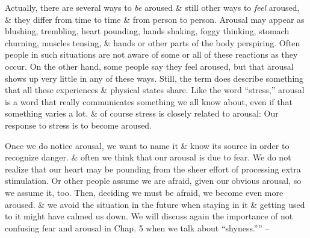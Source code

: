 \documentclass{article}
\numberwithin{equation}{section}
\begin{document}
Actually, there are several ways to \textit{be} aroused \& still other ways to \textit{feel} aroused, \& they differ from time to time \& from person to person. Arousal may appear as blushing, trembling, heart pounding, hands shaking, foggy thinking, stomach churning, muscles tensing, \& hands or other parts of the body perspiring. Often people in such situations are not aware of some or all of these reactions as they occur. On the other hand, some people say they feel aroused, but that arousal shows up very little in any of these ways. Still, the term does describe something that all these experiences \& physical states share. Like the word ``stress,'' arousal is a word that really communicates something we all know about, even if that something varies a lot. \& of course stress is closely related to arousal: Our response to stress is to become aroused.

Once we do notice arousal, we want to name it \& know its source in order to recognize danger. \& often we think that our arousal is due to fear. We do not realize that our heart may be pounding from the sheer effort of processing extra stimulation. Or other people assume we are afraid, given our obvious arousal, so we assume it, too. Then, deciding we must be afraid, we become even more aroused. \& we avoid the situation in the future when staying in it \& getting used to it might have calmed us down. We will discuss again the importance of not confusing fear and arousal in Chap. 5 when we talk about ``shyness.'''' -- \cite[pp. 43--44]{Aron2013}
\end{document}
